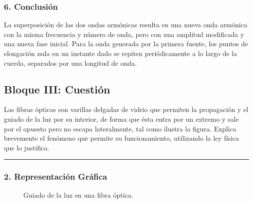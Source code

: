 \subsubsection*{6. Conclusión}
\begin{cajaconclusion}
La superposición de las dos ondas armónicas resulta en una nueva onda armónica con la misma frecuencia y número de onda, pero con una amplitud modificada y una nueva fase inicial. Para la onda generada por la primera fuente, los puntos de elongación nula en un instante dado se repiten periódicamente a lo largo de la cuerda, separados por una longitud de onda.
\end{cajaconclusion}

\newpage

\subsection{Bloque III: Cuestión}
\label{subsec:A3_2012_jun_ord}
\begin{cajaenunciado}
Las fibras ópticas son varillas delgadas de vidrio que permiten la propagación y el guiado de la luz por su interior, de forma que ésta entra por un extremo y sale por el opuesto pero no escapa lateralmente, tal como ilustra la figura. Explica brevemente el fenómeno que permite su funcionamiento, utilizando la ley física que lo justifica.
\end{cajaenunciado}
\hrule

\subsubsection*{2. Representación Gráfica}
\begin{figure}[H]
    \centering
    \caption{Guiado de la luz en una fibra óptica.}
\end{figure}

